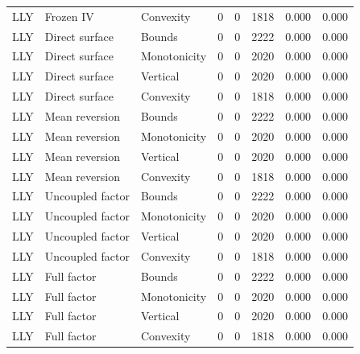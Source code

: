 \begin{tabular}{lllrrrrr}
LLY & Frozen IV & Convexity & 0 & 0 & 1818 & 0.000 & 0.000 \\
LLY & Direct surface & Bounds & 0 & 0 & 2222 & 0.000 & 0.000 \\
LLY & Direct surface & Monotonicity & 0 & 0 & 2020 & 0.000 & 0.000 \\
LLY & Direct surface & Vertical & 0 & 0 & 2020 & 0.000 & 0.000 \\
LLY & Direct surface & Convexity & 0 & 0 & 1818 & 0.000 & 0.000 \\
LLY & Mean reversion & Bounds & 0 & 0 & 2222 & 0.000 & 0.000 \\
LLY & Mean reversion & Monotonicity & 0 & 0 & 2020 & 0.000 & 0.000 \\
LLY & Mean reversion & Vertical & 0 & 0 & 2020 & 0.000 & 0.000 \\
LLY & Mean reversion & Convexity & 0 & 0 & 1818 & 0.000 & 0.000 \\
LLY & Uncoupled factor & Bounds & 0 & 0 & 2222 & 0.000 & 0.000 \\
LLY & Uncoupled factor & Monotonicity & 0 & 0 & 2020 & 0.000 & 0.000 \\
LLY & Uncoupled factor & Vertical & 0 & 0 & 2020 & 0.000 & 0.000 \\
LLY & Uncoupled factor & Convexity & 0 & 0 & 1818 & 0.000 & 0.000 \\
LLY & Full factor & Bounds & 0 & 0 & 2222 & 0.000 & 0.000 \\
LLY & Full factor & Monotonicity & 0 & 0 & 2020 & 0.000 & 0.000 \\
LLY & Full factor & Vertical & 0 & 0 & 2020 & 0.000 & 0.000 \\
LLY & Full factor & Convexity & 0 & 0 & 1818 & 0.000 & 0.000 \\
\bottomrule
\end{tabular}
